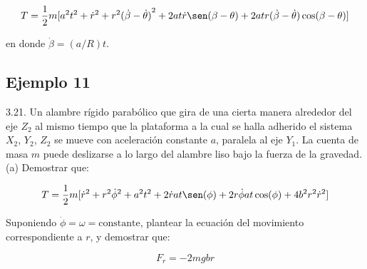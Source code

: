 \begin{equation*}
    T=\frac{1}{2}m[
        a^2t^2+
        \dot{r}^2+
        r^2{(\dot{\beta}-\dot{\theta})}^2+
        2at\dot{r}\sen(\beta-\theta)+
        2atr(\dot{\beta}-\dot{\theta})\cos(\beta-\theta)
    ]
\end{equation*}

en donde $\dot{\beta}=(a/R)t$.

\subsection{Ejemplo 11}
3.21. Un alambre rígido parabólico que gira de una cierta manera alrededor del
eje $Z_2$ al mismo tiempo que la plataforma a la cual se halla adherido el
sistema $X_2$, $Y_2$, $Z_2$ se mueve con aceleración constante $a$, paralela al
eje $Y_1$. La cuenta de masa $m$ puede deslizarse a lo largo del alambre liso
bajo la fuerza de la gravedad. (a) Demostrar que:

\begin{equation*}
    T=\frac{1}{2}m[
        \dot{r}^2+
        r^2\dot{\phi}^2+
        a^2t^2+
        2\dot{r}at\sen(\phi)+
        2r\dot{\phi}at\cos(\phi)+
        4b^2r^2\dot{r}^2
    ]
\end{equation*}

Suponiendo $\dot{\phi}=\omega=\text{constante}$, plantear la ecuación del
movimiento correspondiente a $r$, y demostrar que:

\begin{equation*}
    F_r=-2mgbr
\end{equation*}

